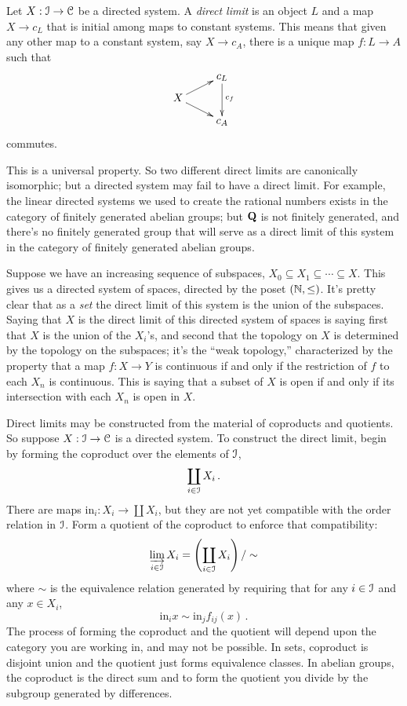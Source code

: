 \begin{definition}
Let $X:\mathcal I\to\mathcal C$ be a directed system.
A {\em direct limit} is an object $L$ and a map $X\to c_L$ that is initial among maps to constant systems. This means that given any other map to a constant system, say $X\to c_A$, there is a unique map $f:L\to A$ such that 
\[
\xymatrix@R=8pt{
& c_L \ar[dd]^{c_f} \\
X \ar[ur] \ar[dr] \\
& c_A
}\]
commutes.
\end{definition}
This is a universal property. So two different direct limits are canonically isomorphic; but a directed system may fail to have a direct limit. For example, the linear directed systems we used to create the rational numbers exists in the category of finitely generated abelian groups; but $\mathbf Q$ is not finitely generated, and there's no finitely generated group that will serve as a direct limit of this system in the category of finitely generated abelian groups. 
\begin{example}
Suppose we have an increasing sequence of subspaces, 
$X_0\subseteq X_1\subseteq\cdots\subseteq X$. This gives us a directed system
of spaces, directed by the poset $(\mathbb N,\leq)$. It's pretty clear that as a 
{\em set} the direct limit of this system is the union of the subspaces. 
Saying that $X$ is the direct limit of this directed system of spaces is 
saying first that $X$ is the union of the $X_i$'s, and second 
that the topology on $X$ is determined
by the topology on the subspaces; it's the ``weak topology,'' characterized
by the property that a map $f:X\to Y$ is continuous if and only if the 
restriction of $f$ to each $X_n$ is continuous. This is saying that a subset 
of $X$ is open if and only if its intersection with each $X_n$ is open in $X$.
\end{example}
Direct limits may be constructed from the material of coproducts and quotients. So suppose $X:\mathcal I\to\mathcal C$ is a directed system. To construct the direct limit, begin by forming the coproduct over the elements of $\mathcal I$,
\[
\coprod_{i\in\mathcal I}X_i\,.
\]
There are maps $\mathrm{in}_i:X_i\to\coprod X_i$, but they are not yet compatible with the order relation in $\mathcal I$. Form a quotient of the coproduct to enforce that compatibility: 
\[
\varinjlim_{i\in\mathcal I}X_i=\left(\coprod_{i\in\mathcal I}X_i\right)/\sim
\]
where $\sim$ is the equivalence relation generated by requiring that 
for any $i\in\mathcal I$ and any $x\in X_i$, 
\[
\mathrm{in}_ix\sim\mathrm{in}_j f_{ij}(x)\,.
\]
The process of forming the coproduct and the quotient will depend upon the 
category you are working in, and may not be possible. 
In sets, coproduct is disjoint union and the
quotient just forms equivalence classes. In abelian groups, the coproduct
is the direct sum and to form the quotient you divide by the subgroup 
generated by differences. 

